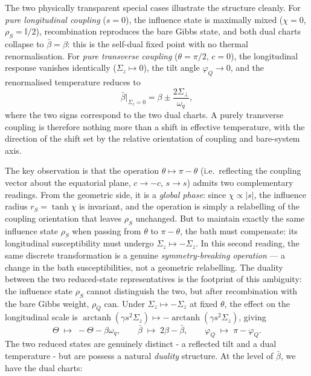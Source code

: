 The two physically transparent special cases illustrate the structure cleanly. For \emph{pure
longitudinal coupling} (\(s=0\)), the influence state is maximally mixed (\(\chi=0\),
\(\rho_S=\mathbb I/2\)), recombination reproduces the bare Gibbs state, and both dual charts
collapse to \(\bar\beta = \beta\): this is the self-dual fixed point with no thermal renormalisation.
For \emph{pure transverse coupling} (\(\theta=\pi/2\), \(c=0\)), the longitudinal response
vanishes identically (\(\Sigma_z\mapsto0\)), the tilt angle \(\varphi_Q\to 0\), and the
renormalised temperature reduces to
\begin{equation}
    \bar\beta\big|_{\Sigma_z=0} = \beta \pm \frac{2\Sigma_\perp}{\omega_q},
    \label{eq:bar_beta_transverse}
\end{equation}
where the two signs correspond to the two dual charts. A purely transverse coupling is therefore
nothing more than a shift in effective temperature, with the direction of the shift set by the
relative orientation of coupling and bare-system axis.

The key observation is that the operation \(\theta\mapsto\pi-\theta\) (i.e.\ reflecting the
coupling vector about the equatorial plane, \(c\to-c\), \(s\to s\)) admits two complementary
readings. From the geometric side, it is a \emph{global phase}: since \(\chi\propto|s|\), the
influence radius \(r_S=\tanh\chi\) is invariant, and the operation is simply a relabelling of the
coupling orientation that leaves \(\rho_S\) unchanged. But to maintain exactly the same influence
state \(\rho_S\) when passing from \(\theta\) to \(\pi-\theta\), the bath must compensate: its
longitudinal susceptibility must undergo \(\Sigma_z\mapsto-\Sigma_z\). In this second reading, the
same discrete transformation is a genuine \emph{symmetry-breaking operation} — a change in the
bath susceptibilities, not a geometric relabelling. The duality between the two reduced-state
representatives is the footprint of this ambiguity: the influence state \(\rho_S\) cannot
distinguish the two, but after recombination with the bare Gibbs weight, \(\rho_Q\) can.
Under \(\Sigma_z\mapsto-\Sigma_z\) at fixed \(\theta\), the effect on the longitudinal scale is
$\operatorname{arctanh}(\gamma s^2 \Sigma_z) \mapsto -\operatorname{arctanh}(\gamma s^2 \Sigma_z)$, giving
\begin{equation}
    \Theta \;\mapsto\; -\Theta - \beta\omega_q, \qquad
    \bar\beta \;\mapsto\; 2\beta - \bar\beta, \qquad
    \varphi_Q \;\mapsto\; \pi - \varphi_Q.
    \label{eq:orientation_flip}
\end{equation}
The two reduced states are genuinely distinct - a reflected tilt and a dual temperature - but are possess a natural \emph{duality} structure. At the level of \(\bar\beta\), we have the dual charts:

